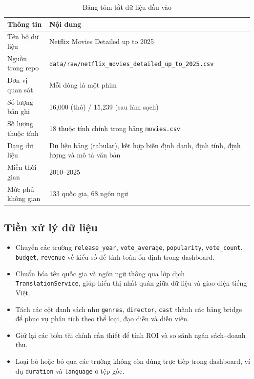 \begin{table}[H]
\centering
\renewcommand{\arraystretch}{1.3}
\begin{tabularx}{\textwidth}{|p{4cm}|X|}
\hline
\textbf{Thông tin} & \textbf{Nội dung} \\
\hline
Tên bộ dữ liệu & Netflix Movies Detailed up to 2025 \\
\hline
Nguồn trong repo & \texttt{data/raw/netflix\_movies\_detailed\_up\_to\_2025.csv} \\
\hline
Đơn vị quan sát & Mỗi dòng là một phim \\
\hline
Số lượng bản ghi & 16{,}000 (thô) / 15{,}239 (sau làm sạch) \\
\hline
Số lượng thuộc tính & 18 thuộc tính chính trong bảng \texttt{movies.csv} \\
\hline
Dạng dữ liệu & Dữ liệu bảng (tabular), kết hợp biến định danh, định tính, định lượng và mô tả văn bản \\
\hline
Miền thời gian & 2010--2025 \\
\hline
Mức phủ không gian & 133 quốc gia, 68 ngôn ngữ \\
\hline
\end{tabularx}
\caption{Bảng tóm tắt dữ liệu đầu vào}
\end{table}

\subsection{Tiền xử lý dữ liệu}
\begin{itemize}[leftmargin=2em]
    \item Chuyển các trường \texttt{release\_year}, \texttt{vote\_average}, \texttt{popularity}, \texttt{vote\_count}, \texttt{budget}, \texttt{revenue} về kiểu số để tính toán ổn định trong dashboard.
    \item Chuẩn hóa tên quốc gia và ngôn ngữ thông qua lớp dịch \texttt{TranslationService}, giúp hiển thị nhất quán giữa dữ liệu và giao diện tiếng Việt.
    \item Tách các cột danh sách như \texttt{genres}, \texttt{director}, \texttt{cast} thành các bảng bridge để phục vụ phân tích theo thể loại, đạo diễn và diễn viên.
    \item Giữ lại các biến tài chính cần thiết để tính ROI và so sánh ngân sách--doanh thu.
    \item Loại bỏ hoặc bỏ qua các trường không còn dùng trực tiếp trong dashboard, ví dụ \texttt{duration} và \texttt{language} ở tệp gốc.
\end{itemize}

